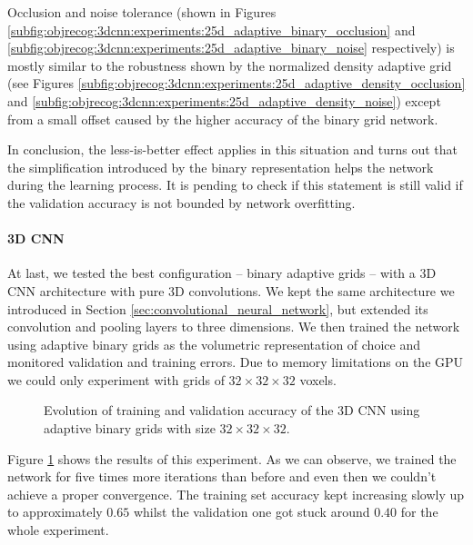 Occlusion and noise tolerance (shown in Figures \ref{subfig:objrecog:3dcnn:experiments:25d_adaptive_binary_occlusion} and \ref{subfig:objrecog:3dcnn:experiments:25d_adaptive_binary_noise} respectively) is mostly similar to the robustness shown by the normalized density adaptive grid (see Figures \ref{subfig:objrecog:3dcnn:experiments:25d_adaptive_density_occlusion} and \ref{subfig:objrecog:3dcnn:experiments:25d_adaptive_density_noise}) except from a small offset caused by the higher accuracy of the binary grid network.

In conclusion, the less-is-better effect applies in this situation and turns out that the simplification introduced by the binary representation helps the network during the learning process. It is pending to check if this statement is still valid if the validation accuracy is not bounded by network overfitting.

\paragraph{3D \ac{CNN}}

At last, we tested the best configuration -- binary adaptive grids -- with a \acs{3D} \acs{CNN} architecture with pure \acs{3D} convolutions. We kept the same architecture we introduced in Section \ref{sec:convolutional_neural_network}, but extended its convolution and pooling layers to three dimensions. We then trained the network using adaptive binary grids as the volumetric representation of choice and monitored validation and training errors. Due to memory limitations on the \acs{GPU} we could only experiment with grids of $32\times32\times32$ voxels.

\begin{figure}[!hbt]
	\centering
	
	\caption{Evolution of training and validation accuracy of the \acs{3D} \acs{CNN} using adaptive binary grids with size $32\times32\times32$.}
	\label{fig:objrecog:3dcnn:experiments:3d}
\end{figure}

\newpage

Figure \ref{fig:objrecog:3dcnn:experiments:3d} shows the results of this experiment. As we can observe, we trained the network for five times more iterations than before and even then we couldn't achieve a proper convergence. The training set accuracy kept increasing slowly up to approximately $0.65$ whilst the validation one got stuck around $0.40$ for the whole experiment.

